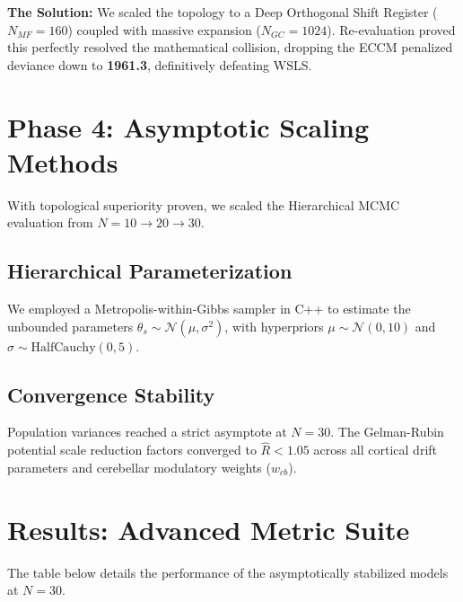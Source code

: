 \documentclass[11pt,a4paper,twocolumn]{article}
\begin{document}
\textbf{The Solution:} We scaled the topology to a Deep Orthogonal Shift Register ($N_{MF}=160$) coupled with massive expansion ($N_{GC}=1024$). Re-evaluation proved this perfectly resolved the mathematical collision, dropping the ECCM penalized deviance down to \textbf{1961.3}, definitively defeating WSLS.

\section{Phase 4: Asymptotic Scaling Methods}
With topological superiority proven, we scaled the Hierarchical MCMC evaluation from $N=10 \to 20 \to 30$.
\subsection{Hierarchical Parameterization}
We employed a Metropolis-within-Gibbs sampler in C++ to estimate the unbounded parameters $\theta_{s} \sim \mathcal{N}(\mu, \sigma^2)$, with hyperpriors $\mu \sim \mathcal{N}(0, 10)$ and $\sigma \sim \text{HalfCauchy}(0, 5)$. 

\subsection{Convergence Stability}
Population variances reached a strict asymptote at $N=30$. The Gelman-Rubin potential scale reduction factors converged to $\hat{R} < 1.05$ across all cortical drift parameters and cerebellar modulatory weights ($w_{cb}$).

\section{Results: Advanced Metric Suite}
The table below details the performance of the asymptotically stabilized models at $N=30$.

\begin{table}[h]
\centering
{}
\caption{Global performance at $N=30$. $^*$ indicates significant temporal autocorrelation ($p<0.05$).}
\end{table}
\end{document}
